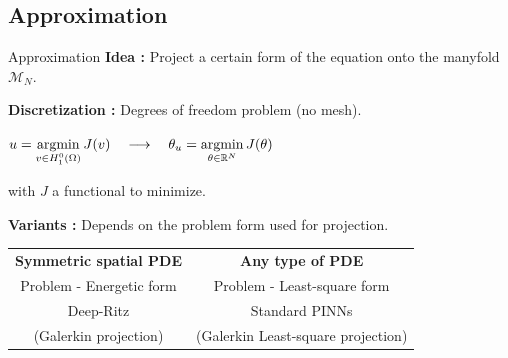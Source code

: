 \subsection{Approximation}

\begin{frame}{Approximation}
	\textbf{Idea :} Project a certain form of the equation onto the manyfold $\mathcal{M}_N$. \\
	
	\vspace{10pt}
	
	\textbf{Discretization :} Degrees of freedom problem (no mesh).
	\begin{center}
		$\displaystyle u=\operatorname*{argmin}_{v\in H_1^0(\Omega)} J(v) \quad \longrightarrow \quad \theta_u=\operatorname*{argmin}_{\theta\in \mathbb{R}^N} J(\theta) $
	\end{center}
	with $J$ a functional to minimize.
	
	\vspace{10pt}
	
	\textbf{Variants :} Depends on the problem form used for projection.
	
	\begin{center}
		\begin{tabular}{c|c}
			\textbf{Symmetric spatial PDE} & \textbf{Any type of PDE} \\
			Problem - Energetic form & Problem - Least-square form \\
			Deep-Ritz & Standard PINNs \\
			(Galerkin projection) & (Galerkin Least-square projection)
		\end{tabular}
	\end{center}
\end{frame}

